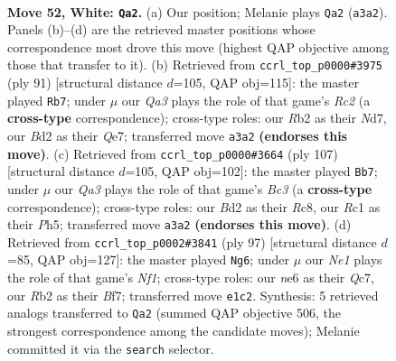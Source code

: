 \documentclass[11pt]{article}
\begin{document}
\clearpage

\begin{figure}[p]\centering
\begin{subfigure}{0.46\textwidth}\centering
\resizebox{\linewidth}{!}{%
\newchessgame
\chessboard[
  setfen={nr6/1q2b2k/p3nr2/P1p2p1p/3p1Pp1/QP4P1/1R1BP2P/2RNN1K1 w - - 20 52},
  showmover=false,
  pgfstyle=straightmove, color=movearrow, markmove={a3-a2}
]}
\caption{}
\end{subfigure}\hfill
\begin{subfigure}{0.46\textwidth}\centering
\resizebox{\linewidth}{!}{%
\newchessgame
\chessboard[
  setfen={8/2rnqp1k/r2pb1p1/p3p2p/N1P1P3/1PQR3P/2B2PP1/R5K1 b - - 13 46},
  showmover=false,
  pgfstyle=straightmove, color=movearrow, markmove={c7-b7}
]}
\caption{}
\end{subfigure}
\\[4pt]
\begin{subfigure}{0.46\textwidth}\centering
\resizebox{\linewidth}{!}{%
\newchessgame
\chessboard[
  setfen={2r3k1/3rqp2/1pbpn1p1/7p/1PP1Pp1P/1B1R1N2/5PP1/2Q1R1K1 b - - 38 54},
  showmover=false,
  pgfstyle=straightmove, color=movearrow, markmove={c6-b7}
]}
\caption{}
\end{subfigure}\hfill
\begin{subfigure}{0.46\textwidth}\centering
\resizebox{\linewidth}{!}{%
\newchessgame
\chessboard[
  setfen={3rrn1k/2q2bp1/2p1pb1p/1pP2p2/3P1P2/PB2RNPP/1B3QR1/7K b - - 18 49},
  showmover=false,
  pgfstyle=straightmove, color=movearrow, markmove={f8-g6}
]}
\caption{}
\end{subfigure}
\caption{\textbf{Move 52, White: \texttt{Qa2}.} (a) Our position; Melanie plays \texttt{Qa2} (\texttt{a3a2}). Panels (b)--(d) are the retrieved master positions whose correspondence most drove this move (highest QAP objective among those that transfer to it). (b) Retrieved from \texttt{ccrl\_top\_p0000\#3975} (ply 91) [structural distance $d$=105, QAP obj=115]: the master played \texttt{Rb7}; under $\mu$ our \emph{Qa3} plays the role of that game's \emph{Rc2} (a \textbf{cross-type} correspondence); cross-type roles: our \emph{R}b2 as their \emph{N}d7, our \emph{B}d2 as their \emph{Q}e7; transferred move \texttt{a3a2} \textbf{(endorses this move)}. (c) Retrieved from \texttt{ccrl\_top\_p0000\#3664} (ply 107) [structural distance $d$=105, QAP obj=102]: the master played \texttt{Bb7}; under $\mu$ our \emph{Qa3} plays the role of that game's \emph{Bc3} (a \textbf{cross-type} correspondence); cross-type roles: our \emph{B}d2 as their \emph{R}c8, our \emph{R}c1 as their \emph{P}h5; transferred move \texttt{a3a2} \textbf{(endorses this move)}. (d) Retrieved from \texttt{ccrl\_top\_p0002\#3841} (ply 97) [structural distance $d$=85, QAP obj=127]: the master played \texttt{Ng6}; under $\mu$ our \emph{Ne1} plays the role of that game's \emph{Nf1}; cross-type roles: our \emph{n}e6 as their \emph{Q}c7, our \emph{R}b2 as their \emph{B}f7; transferred move \texttt{e1c2}. Synthesis: 5 retrieved analogs transferred to \texttt{Qa2} (summed QAP objective 506, the strongest correspondence among the candidate moves); Melanie committed it via the \texttt{search} selector.}
\label{fig:thought-m102}
\end{figure}
\end{document}

